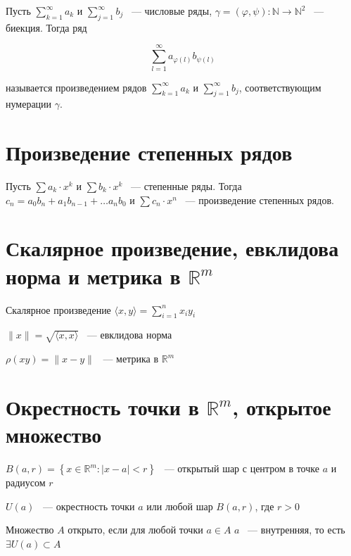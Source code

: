 \documentclass{article}
\begin{document}
        Пусть $\sum\limits^{\infty}_{k = 1} a_k$ и $\sum\limits^{\infty}_{j = 1} b_j$ ~--- числовые ряды, $\gamma = (\varphi, \psi) : \mathbb{N} \rightarrow \mathbb{N}^2$ ~--- биекция. Тогда ряд
        
        $$\sum\limits^{\infty}_{l = 1} a_{\varphi(l)} b_{\psi(l)}$$
        
        называется произведением рядов $\sum\limits^{\infty}_{k = 1} a_k$ и $\sum\limits^{\infty}_{j = 1} b_j$, соответствующим нумерации $\gamma$.
        
    \newpage
    
    \section{Произведение степенных рядов}
    
        Пусть $\sum a_k \cdot x^k$ и $\sum b_k \cdot x^k$ ~--- степенные ряды. Тогда $c_n = a_0 b_n + a_1 b_{n - 1} + \ldots a_n b_0$ и $\sum c_n \cdot x^n$ ~--- произведение степенных рядов.
        
    \newpage
    
    \section{Скалярное произведение, евклидова норма и метрика в $\mathbb{R}^m$}
    
        Скалярное произведение $\langle x, y \rangle = \sum\limits^n_{i = 1} x_i y_i$
        
        $\| x \| = \sqrt{\langle x, x \rangle}$ ~--- евклидова норма
        
        $\rho(x y) = \| x - y \|$ ~--- метрика в $\mathbb{R}^m$
        
    \newpage
    
    \section{Окрестность точки в $\mathbb{R}^m$, открытое множество}
    
        $B(a, r) = \left\{ x \in \mathbb{R}^m : | x - a | < r \right\}$ ~--- открытый шар с центром в точке $a$ и радиусом $r$
        
        $U(a)$ ~--- окрестность точки $a$ или любой шар $B(a, r)$, где $r > 0$
        
        Множество $A$ открыто, если для любой точки $a \in A$ $a$ ~--- внутренняя, то есть $\exists U(a) \subset A$
        
\end{document}
